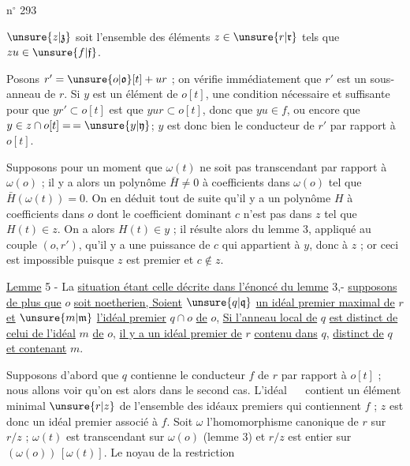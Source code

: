 \hfill n$^\circ$ 293

$\unsure{z|\mathfrak z}$ soit l'ensemble des éléments $z\in\unsure{r|\mathfrak r}$ tels que $zu\in\unsure{f|\mathfrak f}$.

Posons $r'=\unsure{o|\mathfrak o}[t]+ur$ ; on vérifie immédiatement que $r'$ est un sous-anneau de $r$. Si $y$ est un élément de $o[t]$, une condition nécessaire et suffisante pour que $yr'\subset o[t]$ est que $yur\subset o[t]$, donc que $yu\in f$, ou encore que $y\in z\cap o[t]=\,=\unsure{y|\mathfrak y}$; $y$ est donc bien le conducteur de $r'$ par rapport à $o[t]$.

Supposons pour un moment que $\omega(t)$ ne soit pas transcendant par rapport à $\omega(o)$ ; il y a alors un polynôme $\bar H\ne0$ à coefficients dans $\omega(o)$ tel que $\bar H(\omega(t))=0$. On en déduit tout de suite qu'il y a un polynôme $H$ à coefficients dans $o$ dont le coefficient dominant $c$ n'est pas dans $z$ tel que $H(t)\in z$. On a alors $H(t)\in y$ ; il résulte alors du lemme 3, appliqué au couple $(o,r')$, qu'il y a une puissance de $c$ qui appartient à $y$, donc à $z$ ; or ceci est impossible puisque $z$ est premier et $c\notin z$.

\uline{Lemme} 5 - La \uline{situation étant celle décrite dans l'énoncé du lemme} 3,- \uline{supposons de plus que} $o$ \uline{soit noetherien, Soient} $\unsure{q|\mathfrak q}$ \uline{un idéal premier maximal de} $r$ \uline{et} $\unsure{m|\mathfrak m}$ \uline{l'idéal premier} $q\cap o$ \uline{de} $o$, \uline{Si l'anneau local de} $q$ \uline{est distinct de celui de l'idéal} $m$ \uline{de} $o$, \uline{il y a un idéal premier de} $r$ \uline{contenu dans} $q$, \uline{distinct de} $q$ \uline{et contenant} $m$.

Supposons d'abord que $q$ contienne le conducteur $f$ de $r$ par rapport à $o[t]$ ; nous allons voir qu'on est alors dans le second cas. L'idéal $\quad$ contient un élément minimal $\unsure{r|z}$ de l'ensemble des idéaux premiers qui contiennent $f$ ; $z$ est donc un idéal premier associé à $f$. Soit $\omega$ l'homomorphisme canonique de $r$ sur $r/z$ ; $\omega(t)$ est transcendant sur $\omega(o)$ (lemme 3) et $r/z$ est entier sur $(\omega(o))\,[\omega(t)]$. Le noyau de la restriction
